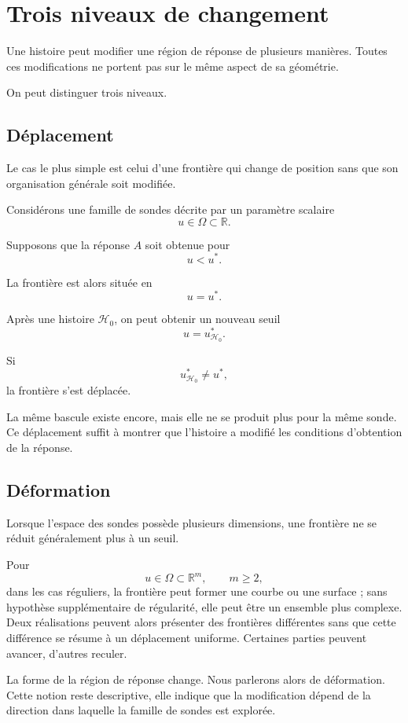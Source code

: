 \section{Trois niveaux de changement}
\label{t3-trois-niveaux-changement}

Une histoire peut modifier une région de réponse de plusieurs manières. Toutes ces modifications ne portent pas sur le même aspect de sa géométrie.

On peut distinguer trois niveaux.

\subsection{Déplacement}

Le cas le plus simple est celui d'une frontière qui change de position sans que son organisation générale soit modifiée.

Considérons une famille de sondes décrite par un paramètre scalaire
\[
u\in\Omega\subset\mathbb R.
\]

Supposons que la réponse $A$ soit obtenue pour
\[
u<u^\ast.
\]

La frontière est alors située en
\[
u=u^\ast.
\]

Après une histoire $\mathcal H_0$, on peut obtenir un nouveau seuil
\[
u=u^\ast_{\mathcal H_0}.
\]

Si
\[
u^\ast_{\mathcal H_0}\neq u^\ast,
\]
la frontière s'est déplacée.

La même bascule existe encore, mais elle ne se produit plus pour la même sonde. Ce déplacement suffit à montrer que l'histoire a modifié les conditions d'obtention de la réponse.

\subsection{Déformation}

Lorsque l'espace des sondes possède plusieurs dimensions, une frontière ne se réduit généralement plus à un seuil.

Pour
\[
u\in\Omega\subset\mathbb R^m,
\qquad m\geq 2,
\]
dans les cas réguliers, la frontière peut former une courbe ou une surface ; sans hypothèse supplémentaire de régularité, elle peut être un ensemble plus complexe. Deux réalisations peuvent alors présenter des frontières différentes sans que cette différence se résume à un déplacement uniforme. Certaines parties peuvent avancer, d'autres reculer.

La forme de la région de réponse change. Nous parlerons alors de déformation. Cette notion reste descriptive, elle indique que la modification dépend de la direction dans laquelle la famille de sondes est explorée.

